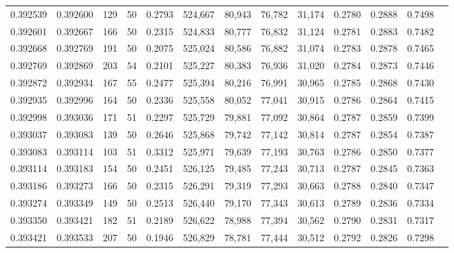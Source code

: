 \begin{tabular}{rrrrrrrrrrrrr}
0.392539 & 0.392600 &   129 &  50 &                                     0.2793 & 524,667 &  80,943 &  76,782 &  31,174 & 0.2780 & 0.2888 & 0.7498 \\
0.392601 & 0.392667 &   166 &  50 &                                     0.2315 & 524,833 &  80,777 &  76,832 &  31,124 & 0.2781 & 0.2883 & 0.7482 \\
0.392668 & 0.392769 &   191 &  50 &                                     0.2075 & 525,024 &  80,586 &  76,882 &  31,074 & 0.2783 & 0.2878 & 0.7465 \\
0.392769 & 0.392869 &   203 &  54 &                                     0.2101 & 525,227 &  80,383 &  76,936 &  31,020 & 0.2784 & 0.2873 & 0.7446 \\
0.392872 & 0.392934 &   167 &  55 &                                     0.2477 & 525,394 &  80,216 &  76,991 &  30,965 & 0.2785 & 0.2868 & 0.7430 \\
0.392935 & 0.392996 &   164 &  50 &                                     0.2336 & 525,558 &  80,052 &  77,041 &  30,915 & 0.2786 & 0.2864 & 0.7415 \\
0.392998 & 0.393036 &   171 &  51 &                                     0.2297 & 525,729 &  79,881 &  77,092 &  30,864 & 0.2787 & 0.2859 & 0.7399 \\
0.393037 & 0.393083 &   139 &  50 &                                     0.2646 & 525,868 &  79,742 &  77,142 &  30,814 & 0.2787 & 0.2854 & 0.7387 \\
0.393083 & 0.393114 &   103 &  51 &                                     0.3312 & 525,971 &  79,639 &  77,193 &  30,763 & 0.2786 & 0.2850 & 0.7377 \\
0.393114 & 0.393183 &   154 &  50 &                                     0.2451 & 526,125 &  79,485 &  77,243 &  30,713 & 0.2787 & 0.2845 & 0.7363 \\
0.393186 & 0.393273 &   166 &  50 &                                     0.2315 & 526,291 &  79,319 &  77,293 &  30,663 & 0.2788 & 0.2840 & 0.7347 \\
0.393274 & 0.393349 &   149 &  50 &                                     0.2513 & 526,440 &  79,170 &  77,343 &  30,613 & 0.2789 & 0.2836 & 0.7334 \\
0.393350 & 0.393421 &   182 &  51 &                                     0.2189 & 526,622 &  78,988 &  77,394 &  30,562 & 0.2790 & 0.2831 & 0.7317 \\
0.393421 & 0.393533 &   207 &  50 &                                     0.1946 & 526,829 &  78,781 &  77,444 &  30,512 & 0.2792 & 0.2826 & 0.7298 \\

\end{tabular}

